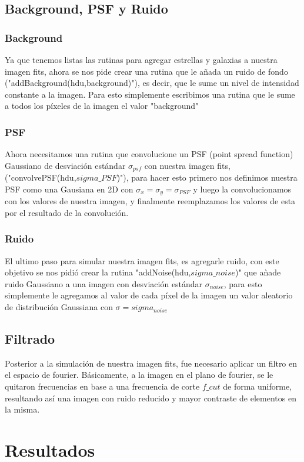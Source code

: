 \documentclass[twocolumn]{AS4201}
\begin{document}
\subsection{Background, PSF y Ruido}
\subsubsection{Background}
Ya que tenemos listas las rutinas para agregar estrellas y galaxias a nuestra imagen fits, ahora se nos pide crear una rutina que le a\~nada un ruido de fondo ("addBackground(hdu,background)"), es decir, que le sume un nivel de intensidad constante a la imagen. Para esto simplemente escribimos una rutina que le sume a todos los píxeles de la imagen el valor "background"
\subsubsection{PSF}
Ahora necesitamos una rutina que convolucione un PSF (point spread function) Gaussiano de desviación estándar $\sigma_{psf}$ con nuestra imagen fits, ("convolvePSF(hdu,$sigma\_PSF$)"), para hacer esto primero nos definimos nuestra PSF como una Gausiana en 2D con $\sigma_x=\sigma_y=\sigma_{PSF}$ y luego la convolucionamos con los valores de nuestra imagen, y finalmente reemplazamos los valores de esta por el resultado de la convolución.
\subsubsection{Ruido}
El ultimo paso para simular nuestra imagen fits, es agregarle ruido, con este objetivo se nos pidió crear la rutina "addNoise(hdu,$sigma\_noise$)" que a\`nade ruido Gaussiano a una imagen con desviación estándar $\sigma_{noise}$, para esto simplemente le agregamos al valor de cada píxel de la imagen un valor aleatorio de distribución Gaussiana con $\sigma=sigma_{noise}$
\subsection{Filtrado}
Posterior a la simulación de nuestra imagen fits, fue necesario aplicar un filtro en el espacio de fourier. Básicamente, a la imagen en el plano de fourier, se le quitaron frecuencias en base a una frecuencia de corte $f\_cut$ de forma uniforme, resultando así una imagen con ruido reducido y mayor contraste de elementos en la misma.

\section{Resultados}
\end{document}
